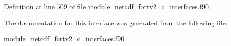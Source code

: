 Definition at line 509 of file module\+\_\+netcdf\+\_\+fortv2\+\_\+c\+\_\+interfaces.\+f90.



The documentation for this interface was generated from the following file\+:\begin{DoxyCompactItemize}
\item 
\hyperlink{module__netcdf__fortv2__c__interfaces_8f90}{module\+\_\+netcdf\+\_\+fortv2\+\_\+c\+\_\+interfaces.\+f90}\end{DoxyCompactItemize}
